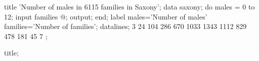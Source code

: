 \begin{listing}
title 'Number of males in 6115 families in Saxony';
data saxony;
   do males = 0 to 12;
      input families @;
      output;
      end;
   label males='Number of males'
      families='Number of families';
datalines;
3  24  104  286  670  1033  1343 1112  829  478  181  45  7
;


title;
\end{listing}
